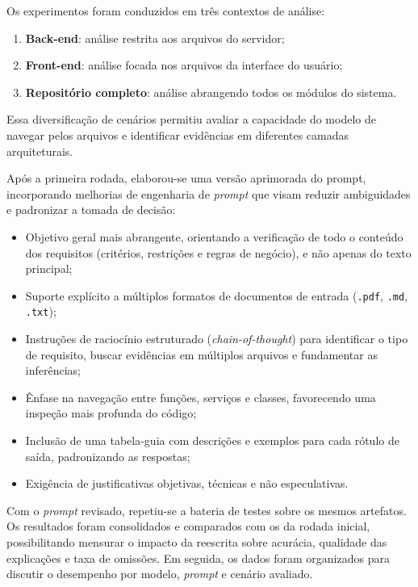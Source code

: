 Os experimentos foram conduzidos em três contextos de análise:
\begin{enumerate}
    \item \textbf{Back-end}: análise restrita aos arquivos do servidor;
    \item \textbf{Front-end}: análise focada nos arquivos da interface do usuário;
    \item \textbf{Repositório completo}: análise abrangendo todos os módulos do sistema.
\end{enumerate}

Essa diversificação de cenários permitiu avaliar a capacidade do modelo de navegar pelos arquivos e identificar evidências em diferentes camadas arquiteturais. 

Após a primeira rodada, elaborou-se uma versão aprimorada do prompt, incorporando melhorias de engenharia de \textit{prompt} que visam reduzir ambiguidades e padronizar a tomada de decisão:

\begin{itemize}
    \item Objetivo geral mais abrangente, orientando a verificação de todo o conteúdo dos requisitos (critérios, restrições e regras de negócio), e não apenas do texto principal;
    \item Suporte explícito a múltiplos formatos de documentos de entrada (\texttt{.pdf}, \texttt{.md}, \texttt{.txt});
    \item Instruções de raciocínio estruturado (\textit{chain-of-thought}) para identificar o tipo de requisito, buscar evidências em múltiplos arquivos e fundamentar as inferências;
    \item Ênfase na navegação entre funções, serviços e classes, favorecendo uma inspeção mais profunda do código;
    \item Inclusão de uma tabela-guia com descrições e exemplos para cada rótulo de saída, padronizando as respostas;
    \item Exigência de justificativas objetivas, técnicas e não especulativas.
\end{itemize}

Com o \textit{prompt} revisado, repetiu-se a bateria de testes sobre os mesmos artefatos. Os resultados foram consolidados e comparados com os da rodada inicial, possibilitando mensurar o impacto da reescrita sobre acurácia, qualidade das explicações e taxa de omissões. Em seguida, os dados foram organizados para discutir o desempenho por modelo, \textit{prompt} e cenário avaliado.

